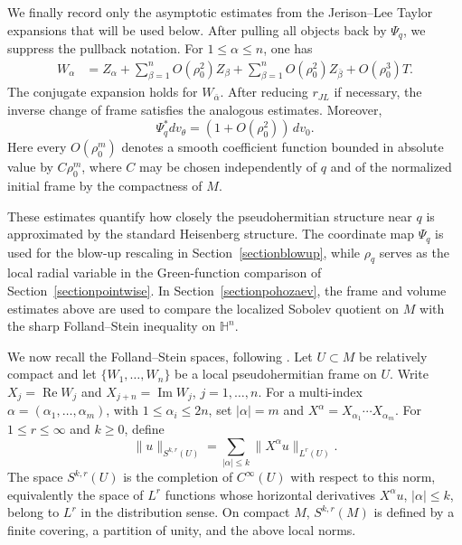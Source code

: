 \documentclass[11pt]{article}
\numberwithin{equation}{section}
\numberwithin{equation}{section}
\begin{document}
We finally record only the asymptotic estimates from the Jerison--Lee
Taylor expansions that will be used below.  After pulling all objects back
by \(\Psi_q\), we suppress the pullback notation.  For
\(1\le\alpha\le n\), one has
\begin{equation}\label{eq:JL-frame-comparison}
\begin{aligned}
W_\alpha
&=
Z_\alpha
+
\sum_{\beta=1}^n O(\rho_0^2)Z_\beta
+
\sum_{\beta=1}^n O(\rho_0^2)Z_{\bar\beta}
+
O(\rho_0^3)T .
\end{aligned}
\end{equation}
The conjugate expansion holds for \(W_{\bar\alpha}\).  After reducing
\(r_{JL}\) if necessary, the inverse change of frame satisfies the analogous
estimates.  Moreover,
\begin{equation}\label{eq:JL-volume-comparison}
\Psi_q^*dv_\theta
=
(1+O(\rho_0^2))\,dv_0 .
\end{equation}
Here every \(O(\rho_0^m)\) denotes a smooth coefficient function bounded in
absolute value by \(C\rho_0^m\), where \(C\) may be chosen independently of
\(q\) and of the normalized initial frame by the compactness of \(M\).

These estimates quantify how closely the pseudohermitian structure near
\(q\) is approximated by the standard Heisenberg structure.  The coordinate
map \(\Psi_q\) is used for the blow-up rescaling in Section~\ref{sectionblowup}, while
\(\rho_q\) serves as the local radial variable in the Green-function
comparison of Section~\ref{sectionpointwise}.  In Section~\ref{sectionpohozaev}, the frame and volume estimates above
are used to compare the localized Sobolev quotient on \(M\) with the sharp
Folland--Stein inequality on \(\mathbb H^n\).
	
	We now recall the Folland--Stein spaces, following \cite{FS1974,JL1987}. Let \(U\subset M\) be relatively compact and let \(\{W_1,\ldots,W_n\}\) be a local pseudohermitian frame on \(U\). Write \(X_j=\operatorname{Re}W_j\) and \(X_{j+n}=\operatorname{Im}W_j\), \(j=1,\ldots,n\). For a multi-index \(\alpha=(\alpha_1,\ldots,\alpha_m)\), with \(1\le\alpha_i\le2n\), set \(|\alpha|=m\) and \(X^\alpha=X_{\alpha_1}\cdots X_{\alpha_m}\). For \(1\le r\le\infty\) and \(k\ge0\), define
	\[
	\|u\|_{S^{k,r}(U)}=\sum_{|\alpha|\le k}\|X^\alpha u\|_{L^r(U)}.
	\]
	The space \(S^{k,r}(U)\) is the completion of \(C^\infty(U)\) with respect to this norm, equivalently the space of \(L^r\) functions whose horizontal derivatives \(X^\alpha u\), \(|\alpha|\le k\), belong to \(L^r\) in the distribution sense. On compact \(M\), \(S^{k,r}(M)\) is defined by a finite covering, a partition of unity, and the above local norms.
	
\end{document}
